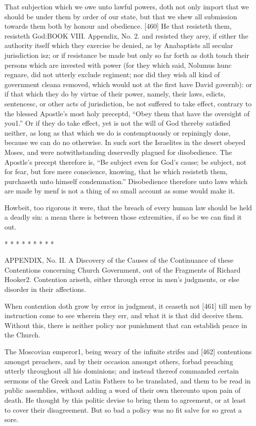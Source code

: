 That subjection which we owe unto lawful powers, doth not only import that we should be under them by order of our state, but that we shew all submission towards them both by honour and obedience. [460] He that resisteth them, resisteth God:BOOK VIII. Appendix, No. 2. and resisted they arey, if either the authority itself which they exercise be denied, as by Anabaptists all secular jurisdiction isz; or if resistance be made but only so far forth as doth touch their persons which are invested with power (for they which said, Nolumus hunc regnare, did not utterly exclude regiment; nor did they wish all kind of government cleana removed, which would not at the first have David governb): or if that which they do by virtue of their power, namely, their laws, edicts, sentencesc, or other acts of jurisdiction, be not suffered to take effect, contrary to the blessed Apostle’s most holy preceptd, “Obey them that have the oversight of you1.” Or if they do take effect, yet is not the will of God thereby satisfied neither, as long as that which we do is contemptuously or repiningly done, because we can do no otherwise. In such sort the Israelites in the desert obeyed Moses, and were notwithstanding deservedly plagued for disobedience. The Apostle’s precept therefore is, “Be subject even for God’s cause; be subject, not for fear, but fore mere conscience, knowing, that he which resisteth them, purchaseth unto himself condemnation.” Disobedience therefore unto laws which are made by menf is not a thing of so small account as some would make it.

Howbeit, too rigorous it were, that the breach of every human law should be held a deadly sin: a mean there is between those extremities, if so be we can find it out.

* * * * * * * * *

APPENDIX, No. II. 
A Discovery of the Causes of the Continuance of these Contentions concerning Church Government, out of the Fragments of Richard Hooker2.
Contention ariseth, either through error in men’s judgments, or else disorder in their affections.

When contention doth grow by error in judgment, it ceaseth not [461] till men by instruction come to see wherein they err, and what it is that did deceive them. Without this, there is neither policy nor punishment that can establish peace in the Church.

The Moscovian emperor1, being weary of the infinite strifes and [462] contentions amongst preachers, and by their occasion amongst others, forbad preaching utterly throughout all his dominions; and instead thereof commanded certain sermons of the Greek and Latin Fathers to be translated, and them to be read in public assemblies, without adding a word of their own thereunto upon pain of death. He thought by this politic devise to bring them to agreement, or at least to cover their disagreement. But so bad a policy was no fit salve for so great a sore.

